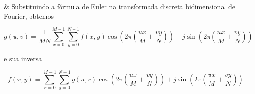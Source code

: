 \begin{easylist}
  & Substituindo a fórmula de Euler na transformada discreta bidimensional de Fourier, obtemos

  \[ g(u, v) = \frac 1{MN} \sum^{M-1}_{x=0}\sum^{N-1}_{y=0} f(x, y)
      \cos\left(2\pi \left(\frac{ux}{M} + \frac{vy}{N}\right)\right) -
     j\sin\left(2\pi \left(\frac{ux}{M} + \frac{vy}{N}\right)\right)   \]

  e sua inversa

  \[ f(x, y) =             \sum^{M-1}_{x=0}\sum^{N-1}_{y=0} g(u, v)
      \cos\left(2\pi \left(\frac{ux}{M} + \frac{vy}{N}\right)\right) +
     j\sin\left(2\pi \left(\frac{ux}{M} + \frac{vy}{N}\right)\right)   \]

\end{easylist}
  
